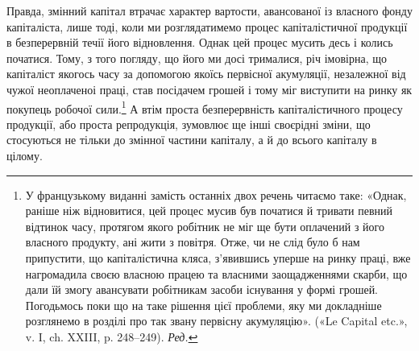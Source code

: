 Правда, змінний капітал втрачає характер вартости, авансованої
із власного фонду капіталіста, лише тоді, коли ми розглядатимемо
процес капіталістичної продукції в безперервній течії
його відновлення. Однак цей процес мусить десь і колись початися.
Тому, з того погляду, що його ми досі трималися, річ
імовірна, що капіталіст якогось часу за допомогою якоїсь первісної
акумуляції, незалежної від чужої неоплаченоі праці,
став посідачем грошей і тому міг виступити на ринку як
покупець робочої сили.\footnote*{
У французькому виданні замість останніх двох речень читаємо
таке: «Однак, раніше ніж відновитися, цей процес мусив був початися
й тривати певний відтинок часу, протягом якого робітник не міг ще бути
оплачений з його власного продукту, ані жити з повітря. Отже, чи не слід
було б нам припустити, що капіталістична кляса, з’явившись уперше
на ринку праці, вже нагромадила своєю власною працею та власними
заощадженнями скарби, що дали їй змогу авансувати робітникам засоби
існування у формі грошей. Погодьмось поки що на таке рішення цієї
проблеми, яку ми докладніше розглянемо в розділі про так звану первісну
акумуляцію». («Le Capital etc.», v. I, ch. XXIII, p. 248--249). \emph{Ред.}
} А втім проста безперервність капіталістичного
процесу продукції, або проста репродукція, зумовлює
ще інші своєрідні зміни, що стосуються не тільки до змінної
частини капіталу, а й до всього капіталу в цілому.

